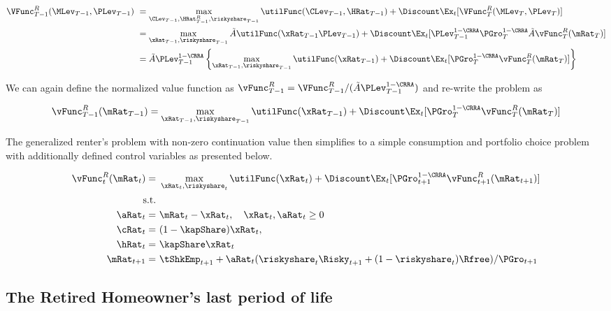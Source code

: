 \documentclass[PortfolioChoiceWithRiskyHousing]{subfiles}
\begin{document}
\begin{equation}
	\begin{split}
		\VFunc^R_{T-1}(\MLev_{T-1}, \PLev_{T-1}) &~= \max_{\CLev_{T-1}, \HRat^R_{T-1}, \riskyshare_{T-1}} \utilFunc(\CLev_{T-1}, \HRat_{T-1}) + \Discount \Ex_{t} [\VFunc^R_{T}(\MLev_{T}, \PLev_{T})] \\
		&~= \max_{\xRat_{T-1}, \riskyshare_{T-1}} \tilde{A} \utilFunc(\xRat_{T-1} \PLev_{T-1}) + \Discount \Ex_{t} [\PLev_{T-1}^{1-\CRRA} \PGro_{T}^{1-\CRRA} \tilde{A} \vFunc^R_{T}(\mRat_{T})] \\
		&~= \tilde{A} \PLev_{T-1}^{1-\CRRA} \left\{ \max_{\xRat_{T-1}, \riskyshare_{T-1}} \utilFunc(\xRat_{T-1} ) + \Discount \Ex_{t} [\PGro_{T}^{1-\CRRA} \vFunc^R_{T}(\mRat_{T})] \right\}
	\end{split}
\end{equation}

We can again define the normalized value function as $\vFunc^R_{T-1} = \VFunc^R_{T-1}/(\tilde{A}\PLev_{T-1}^{1-\CRRA})$ and re-write the problem as

\begin{equation}
	\vFunc^R_{T-1}(\mRat_{T-1}) = \max_{\xRat_{T-1}, \riskyshare_{T-1}} \utilFunc(\xRat_{T-1} ) + \Discount \Ex_{t} [\PGro_{T}^{1-\CRRA} \vFunc^R_{T}(\mRat_{T})]
\end{equation}

The generalized renter's problem with non-zero continuation value then simplifies to a simple consumption and portfolio choice problem with additionally defined control variables as presented below.

\begin{equation}
	\begin{split}
		\vFunc^R_{t}(\mRat_{t}) = &~ \max_{\xRat_{t}, \riskyshare_{t}}\utilFunc(\xRat_{t}) + \Discount \Ex_{t} [\PGro_{t+1}^{1-\CRRA} \vFunc^R_{t+1}(\mRat_{t+1})] \\
		\text{s.t.} &~ \\
		\aRat_{t} = &~ \mRat_{t} - \xRat_{t}, \quad \xRat_{t}, \aRat_{t} \ge 0 \\
		\cRat_{t} = &~ (1-\kapShare) \xRat_{t}, \\
		\hRat_{t} = &~ \kapShare \xRat_{t} \\
		\mRat_{t+1} = &~ \tShkEmp_{t+1} + \aRat_{t}(\riskyshare_{t} \Risky_{t+1} + (1-\riskyshare_{t})\Rfree)/\PGro_{t+1}
	\end{split}
\end{equation}

\subsection{The Retired Homeowner's last period of life}
\end{document}
